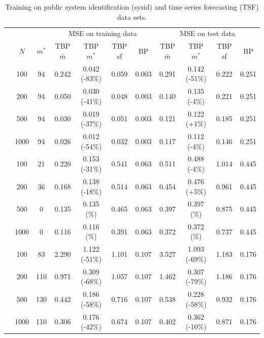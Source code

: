 \documentclass{article} %
\begin{document}
\begin{table}[]
	\caption{Training on public system identification (sysid) and time series forecasting (TSF) data sets.\\[-1ex]}
	\label{tab:res_sysid_2}
	\begin{threeparttable}
		\begingroup\footnotesize\sf
		\addtolength{\tabcolsep}{-0.114em}
		\begin{tabular}{ccccccccccc}
			\toprule
			& & & \multicolumn{4}{c}{MSE on training data} & \multicolumn{4}{c}{MSE on test data} \\\cmidrule(lr){4-7}\cmidrule(lr){8-11}
			& $N$ & $m^*$ & TBP $\bar{m}$ & TBP $m^*$ & TBP sf & BP & TBP $\bar{m}$ & TBP $m^*$ & TBP sf & BP\\\midrule
			\multirow{4}{*}{\rotatebox{90}{Silver-Box}}
			& 100 & 94 & 0.242 & 0.042 (-83\%) & 0.059 & 0.003 & 0.291 & 0.142 (-51\%) & 0.222 & 0.251 \\
			& 200 & 94 & 0.050 & 0.030 (-41\%) & 0.048 & 0.003 & 0.140 & 0.135  (-4\%) & 0.221 & 0.251 \\
			& 500 & 94 & 0.030 & 0.019 (-37\%) & 0.051 & 0.003 & 0.121 & 0.122  (+1\%) & 0.185 & 0.251 \\
			&1000 & 94 & 0.026 & 0.012 (-54\%) & 0.032 & 0.003 & 0.117 & 0.112  (-4\%) & 0.146 & 0.251 \\
			\midrule
			\multirow{4}{*}{\rotatebox{90}{W-H}}
			& 100 & 21 & 0.220 & 0.153 (-31\%)      & 0.541 & 0.063 & 0.511 & 0.488 (-4\%)       & 1.014 & 0.445 \\
			& 200 & 36 & 0.168 & 0.138 (-18\%)      & 0.514 & 0.063 & 0.454 & 0.476 (+5\%)       & 0.961 & 0.445   \\
			& 500 &  0 & 0.135 & 0.135 (\textpm0\%) & 0.465 & 0.063 & 0.397 & 0.397 (\textpm0\%) & 0.875 & 0.445   \\
			&1000 &  0 & 0.116 & 0.116 (\textpm0\%) & 0.391 & 0.063 & 0.372 & 0.372 (\textpm0\%) & 0.737 & 0.445 \\
			\midrule
			\multirow{4}{*}{\rotatebox{90}{RLC}}
			& 100  &  83 & 2.290 & 1.122 (-51\%) & 1.101 & 0.107 & 3.527 & 1.093 (-69\%) & 1.183 & 0.176 \\
			& 200  & 110 & 0.971 & 0.309 (-68\%) & 1.057 & 0.107 & 1.462 & 0.307 (-79\%) & 1.186 & 0.176 \\
			& 500  & 130 & 0.442 & 0.186 (-58\%) & 0.716 & 0.107 & 0.538 & 0.228 (-58\%) & 0.932 & 0.176 \\
			& 1000 & 110 & 0.306 & 0.176 (-42\%) & 0.674 & 0.107 & 0.402 & 0.362 (-10\%) & 0.871 & 0.176 \\			

\end{tabular}
\end{threeparttable}
\end{table}
\end{document}
